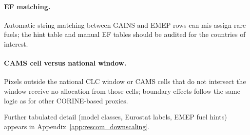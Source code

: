 \paragraph{EF matching.} Automatic string matching between GAINS and EMEP rows
can mis-assign rare fuels; the hint table and manual EF tables should be
audited for the countries of interest.

\paragraph{CAMS cell versus national window.} Pixels outside the national CLC
window or CAMS cells that do not intersect the window receive no allocation from
those cells; boundary effects follow the same logic as for other CORINE-based
proxies.

Further tabulated detail (model classes, Eurostat labels, EMEP fuel hints)
appears in Appendix~\ref{app:rescom_downscaling}.
